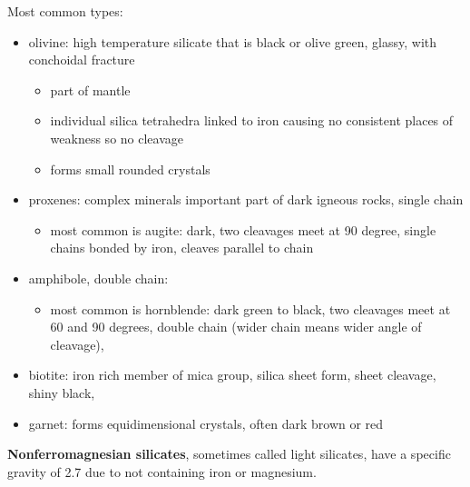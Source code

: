 \documentclass{article}
\begin{document}
Most common types:
\begin{itemize}
    \item olivine: high temperature silicate that is black or olive green, glassy, with conchoidal fracture
    \begin{itemize}
        \item part of mantle
        \item individual silica tetrahedra linked to iron causing no consistent places of weakness so no cleavage
        \item forms small rounded crystals
    \end{itemize}
    \item proxenes: complex minerals important part of dark igneous rocks, single chain
    \begin{itemize}
        \item most common is augite: dark, two cleavages meet at 90 degree, single chains bonded by iron, cleaves parallel to chain
    \end{itemize}
    \item amphibole, double chain:
    \begin{itemize}
        \item most common is hornblende: dark green to black, two cleavages meet at 60 and 90 degrees, double chain (wider chain means wider angle of cleavage),
    \end{itemize}
    \item biotite: iron rich member of mica group, silica sheet form, sheet cleavage, shiny black,
    \item garnet: forms equidimensional crystals, often dark brown or red
\end{itemize}

\textbf{Nonferromagnesian silicates}, sometimes called light silicates, have a specific gravity of 2.7 due to not containing iron or magnesium.
\end{document}
